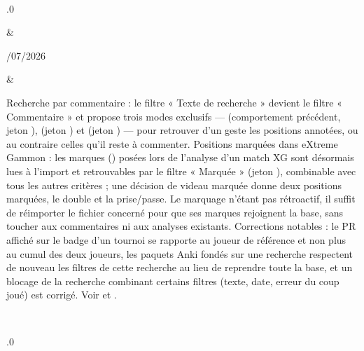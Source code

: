 \documentclass[letterpaper,10pt,french]{sphinxmanual}
\begin{document}
\begin{savenotes}
\begin{longtable}{}
\begin{varwidth}[t]{}
\sphinxbeforeendvarwidth
\end{varwidth}%
\\
\sphinxhline\begin{varwidth}[t]{}
.0
\sphinxbeforeendvarwidth
\end{varwidth}%
&\begin{varwidth}[t]{}
/07/2026
\sphinxbeforeendvarwidth
\end{varwidth}%
&\begin{varwidth}[t]{}
\sphinxAtStartPar
Recherche par commentaire : le filtre « Texte de recherche » devient le filtre « Commentaire » et propose trois modes exclusifs —  (comportement précédent, jeton ),  (jeton ) et  (jeton ) — pour retrouver d’un geste les positions annotées, ou au contraire celles qu’il reste à commenter. Positions marquées dans eXtreme Gammon : les marques () posées lors de l’analyse d’un match XG sont désormais lues à l’import et retrouvables par le filtre « Marquée » (jeton ), combinable avec tous les autres critères ; une décision de videau marquée donne deux positions marquées, le double et la prise/passe. Le marquage n’étant pas rétroactif, il suffit de réimporter le fichier  concerné pour que ses marques rejoignent la base, sans toucher aux commentaires ni aux analyses existants. Corrections notables : le PR affiché sur le badge d’un tournoi se rapporte au joueur de référence et non plus au cumul des deux joueurs, les paquets Anki fondés sur une recherche respectent de nouveau les filtres de cette recherche au lieu de reprendre toute la base, et un blocage de la recherche combinant certains filtres (texte, date, erreur du coup joué) est corrigé. Voir {\hyperref[\detokenize{cmd_mode:cmd-mode}]{}} et {\hyperref[\detokenize{manuel:manuel}]{}}.
\sphinxbeforeendvarwidth
\end{varwidth}%
\\
\sphinxhline\begin{varwidth}[t]{}
.0
\sphinxbeforeendvarwidth
\end{varwidth}%

\end{longtable}
\end{savenotes}
\end{document}
